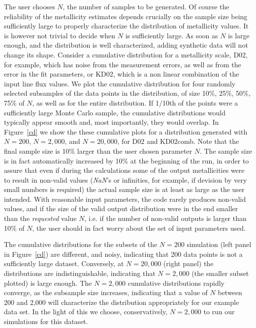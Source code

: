 \documentclass{emulateapj}
\begin{document}
The user chooses $N$, the number of samples to be generated. Of course the reliability of the metallicity estimates depends crucially on the sample size being sufficiently large to properly characterize the distribution of metallicity values. It is however not trivial to decide when $N$ is sufficiently large. As soon as $N$ is large enough, and the distribution is well characterized, adding synthetic data will not change its shape. Consider a cumulative distribution for a metallicity scale, D02, for example, which has noise from the measurement errors, as well as from the error in the fit parameters, or KD02, which is a non linear combination of the input line flux values. We plot the cumulative distribution for four randomly selected subsamples of the data points in the distribution, of size 10\%, 25\%, 50\%, 75\% of $N$, as well as for the entire distribution. If 1/10th of the points were a sufficiently large Monte Carlo sample, the cumulative distributions would typically appear smooth and, most importantly, they would overlap. In Figure~\ref{cd} we show the these cumulative plots for a distribution generated with $N=200$, $N=2,000$, and $N=20,000$, for D02 and KD02comb. Note that the final sample size is 10\% larger than the user chosen parameter $N$. The sample size is in fact automatically increased by 10\% at the beginning of the run, in order to assure that even if during the calculations some of the output metallicities were to result in non-valid values (\emph{NaN}'s or infinities, for example, if devision by very small numbers is required) the actual sample size is at least as large as the user intended. With reasonable input parameters, the code rarely produces non-valid values, and if the size of the valid output distribution were in the end smaller than the \emph{requested} value $N$, i.e. if the number of non-valid outputs is larger than 10\% of $N$, the user should in fact worry about the set of input parameters used. 


The cumulative distributions for the subsets of the $N=200$ simulation (left panel in Figure~\ref{cd}) are different, and noisy, indicating that 200 data points is not a sufficiently large dataset. Conversely, at $N=20,000$ (right panel) the distributions are indistinguishable, indicating that $N=2,000$ (the smaller subset plotted) is large enough. The $N=2,000$ cumulative distributions rapidly converge, as the subsample size increases, indicating that a value of $N$  between 200 and 2,000 will characterize the distribution appropriately for our example data set.  In the light of this we choose, conservatively, $N=2,000$ to run our simulations for this dataset. 
\end{document}
